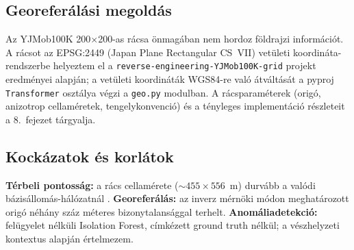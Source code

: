 \subsection{Georeferálási megoldás}

Az YJMob100K 200$\times$200-as rácsa önmagában nem hordoz földrajzi információt. A rácsot az EPSG:2449 (Japan Plane Rectangular CS~VII) vetületi koordináta-rendszerbe helyeztem el a \texttt{reverse-engineering-YJMob100K-grid} projekt \cite{pinter2024revealing} eredményei alapján; a vetületi koordináták WGS84-re való átváltását a pyproj \texttt{Transformer} osztálya végzi a \texttt{geo.py} modulban. A rácsparaméterek (origó, anizotrop cellaméretek, tengelykonvenció) és a tényleges implementáció részleteit a 8.\ fejezet tárgyalja.

\subsection{Kockázatok és korlátok}

\textbf{Térbeli pontosság:} a rács cellamérete (${\sim}455 \times 556$~m) durvább a valódi bázisállomás-hálózatnál \cite{gonzalez2008understanding}. \textbf{Georeferálás:} az inverz mérnöki módon meghatározott origó néhány száz méteres bizonytalansággal terhelt. \textbf{Anomáliadetekció:} felügyelet nélküli Isolation Forest, címkézett ground truth nélkül; a vészhelyzeti kontextus alapján értelmezem.
